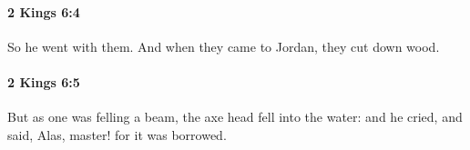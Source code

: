 		\paragraph{2 Kings 6:4} %
			\label{2KINGS-6-4}

			So he went with them. And when they came to Jordan, they cut down wood.


		\paragraph{2 Kings 6:5} %
			\label{2KINGS-6-5}

			But as one was felling a beam, the axe head fell into the water: and he cried, and said, Alas, master! for it was borrowed.


